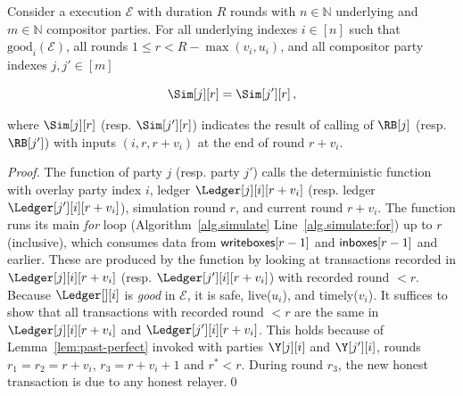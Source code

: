 \begin{lemma}\label{lem:cross-party}
  Consider a \rollerblade execution $\mathcal{E}$ with duration $R$ rounds
  with $n \in \mathbb{N}$ underlying
  and $m \in \mathbb{N}$ compositor parties.
  For
  all underlying indexes $i \in [n]$ such that $\text{good}_i(\mathcal{E})$,
  all rounds $1 \leq r < R - \max(v_i, u_i)$,
  and
  all compositor party indexes $j, j' \in [m]$

  \[
    \Sim[j][r] = \Sim[j'][r]\,,
  \]

  where $\Sim[j][r]$ (resp. $\Sim[j'][r]$) indicates the result of calling
  \emulateMachine of $\RB[j]$ (resp. $\RB[j']$) with inputs
  $(i, r, r + v_i)$
  at the end of round $r + v_i$.
\end{lemma}
\begin{proof}
  The function \emulateMachine of party $j$ (resp. party $j'$)
  calls the deterministic function \simulate with overlay party index $i$,
  ledger $\Ledger[j][i][r + v_i]$ (resp. ledger $\Ledger[j'][i][r + v_i]$), simulation round
  $r$, and current round $r + v_i$. The function \simulate runs its main
  \emph{for} loop (Algorithm~\ref{alg.simulate} Line~\ref{alg.simulate:for})
  up to $r$ (inclusive), which consumes data from $\textsf{writeboxes}[r - 1]$
  and $\textsf{inboxes}[r - 1]$ and earlier. These are produced by the function
  \prepareSimulationInputs by looking at transactions recorded in $\Ledger[j][i][r + v_i]$
  (resp. $\Ledger[j'][i][r + v_i]$) with recorded round $< r$.
  Because $\Ledger[][i]$ is \emph{good} in $\mathcal{E}$, it is safe, live($u_i$), and timely($v_i$).
  It suffices to show that all transactions with recorded round
  $< r$ are the same in $\Ledger[j][i][r + v_i]$ and $\Ledger[j'][i][r + v_i]$.
  This holds because of Lemma~\ref{lem:past-perfect} invoked with parties $\Y[j][i]$ and $\Y[j'][i]$,
  rounds $r_1 = r_2 = r + v_i$, $r_3 = r + v_i + 1$ and $r^* < r$.
  During round $r_3$, the new honest transaction is due to any honest
  relayer.\qed
\end{proof}

